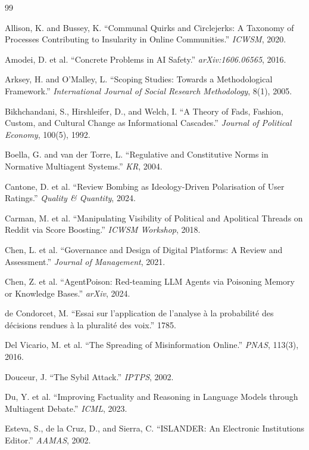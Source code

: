 \documentclass[11pt]{article}
\begin{document}
\begin{thebibliography}{99}

 Allison, K. and Bussey, K. ``Communal Quirks and Circlejerks: A Taxonomy of Processes Contributing to Insularity in Online Communities.'' \textit{ICWSM}, 2020.

 Amodei, D. et al. ``Concrete Problems in AI Safety.'' \textit{arXiv:1606.06565}, 2016.

 Arksey, H. and O'Malley, L. ``Scoping Studies: Towards a Methodological Framework.'' \textit{International Journal of Social Research Methodology}, 8(1), 2005.

 Bikhchandani, S., Hirshleifer, D., and Welch, I. ``A Theory of Fads, Fashion, Custom, and Cultural Change as Informational Cascades.'' \textit{Journal of Political Economy}, 100(5), 1992.

 Boella, G. and van der Torre, L. ``Regulative and Constitutive Norms in Normative Multiagent Systems.'' \textit{KR}, 2004.

 Cantone, D. et al. ``Review Bombing as Ideology-Driven Polarisation of User Ratings.'' \textit{Quality \& Quantity}, 2024.

 Carman, M. et al. ``Manipulating Visibility of Political and Apolitical Threads on Reddit via Score Boosting.'' \textit{ICWSM Workshop}, 2018.

 Chen, L. et al. ``Governance and Design of Digital Platforms: A Review and Assessment.'' \textit{Journal of Management}, 2021.

 Chen, Z. et al. ``AgentPoison: Red-teaming LLM Agents via Poisoning Memory or Knowledge Bases.'' \textit{arXiv}, 2024.

 de Condorcet, M. ``Essai sur l'application de l'analyse \`{a} la probabilit\'{e} des d\'{e}cisions rendues \`{a} la pluralit\'{e} des voix.'' 1785.

 Del Vicario, M. et al. ``The Spreading of Misinformation Online.'' \textit{PNAS}, 113(3), 2016.

 Douceur, J. ``The Sybil Attack.'' \textit{IPTPS}, 2002.

 Du, Y. et al. ``Improving Factuality and Reasoning in Language Models through Multiagent Debate.'' \textit{ICML}, 2023.

 Esteva, S., de la Cruz, D., and Sierra, C. ``ISLANDER: An Electronic Institutions Editor.'' \textit{AAMAS}, 2002.


\end{thebibliography}
\end{document}

